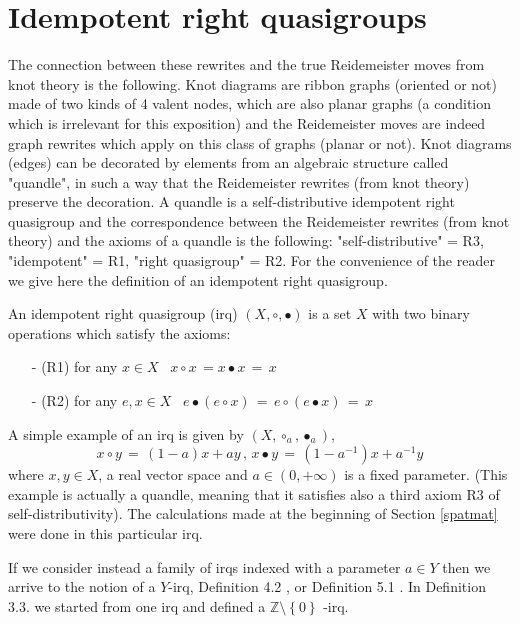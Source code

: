 \section{Idempotent right quasigroups}

The connection between these rewrites and the true Reidemeister moves from knot theory is the following. Knot diagrams are ribbon graphs (oriented or not) made of two kinds of 4 valent nodes, which are also planar graphs (a condition which is irrelevant for this exposition) and the Reidemeister moves are indeed graph rewrites which apply on this class of graphs (planar or not). Knot diagrams (edges) can be decorated by elements from an algebraic structure called "quandle", in such a way that the Reidemeister rewrites (from knot theory) preserve the decoration. A quandle is a self-distributive idempotent right quasigroup and the correspondence between the Reidemeister rewrites (from knot theory) and the axioms of a quandle is the following: "self-distributive" = R3, "idempotent" = R1, "right quasigroup" = R2. For the convenience of the reader we give here the definition of an idempotent right quasigroup. 

\begin{definition}
An idempotent right quasigroup (irq) $\displaystyle (X, \circ, \bullet)$ is a set $X$ with two binary operations which satisfy the axioms: 
\begin{enumerate}
\item[-] (R1) for any $x \in X$ \, $\displaystyle x \circ x \, = x \bullet x \, = \, x$
\item[-] (R2) for any $e, x \in X$ \, $\displaystyle e \bullet ( e \circ x) \, = \, e \circ (e \bullet x) \, = \, x$
\end{enumerate}
\label{irq}
\end{definition}

A simple example of an irq is given by $\displaystyle (X, \circ_{a}, \bullet_{a})$, 
$$\displaystyle x \circ y \, = \, (1-a)x + ay \, , \, x \bullet y \, = \, (1-a^{-1})x + a^{-1}y $$
where $x, y \in X$, a real vector space and $a \in (0, + \infty)$ is a fixed parameter. (This example is actually a quandle, meaning that it satisfies also a third axiom R3 of self-distributivity). The calculations made at the beginning of Section \ref{spatmat} were done in this particular irq. 

If we consider instead a family of irqs indexed with a parameter $a \in Y$ then we arrive to the notion of a $Y$-irq, Definition 4.2 \cite{buligabraided}, or Definition 5.1 \cite{buligaglc}. In Definition 3.3. \cite{buligairq} we started from one irq and defined a $\mathbb{Z} \setminus \left\{ 0 \right\}$ -irq. 

